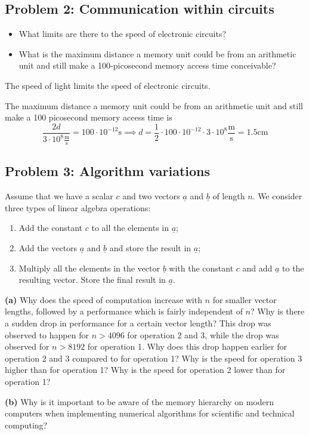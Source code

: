 \subsection{Problem 2: Communication within circuits} %
\label{sec:exercise_2}
\begin{question}
  \begin{itemize}
    \item What limits are there to the speed of electronic circuits?
    \item What is the maximum distance a memory unit could be from an arithmetic unit and still make a 100-picosecond memory access time conceivable?
  \end{itemize}
\end{question}

The speed of light limits the speed of electronic circuits.

The maximum distance a memory unit could be from an arithmetic unit and still make a 100 picosecond memory access time is
\begin{equation}
  \frac{2d}{3\cdot 10^8 \mathrm{\frac{m}{s}}} = 100\cdot 10^{-12} \mathrm{s}
  \implies d =\frac{1}{2} \cdot 100 \cdot 10^{-12} \cdot 3\cdot 10^8 \mathrm{\frac{m}{s}} = 1.5 \mathrm{cm}
\end{equation}
\pagebreak


\subsection{Problem 3: Algorithm variations} %
\label{sec:exercise_3_algorithm_variations}
\begin{question}
  Assume that we have a scalar $c$ and two vectors $\underline{a}$ and $\underline{b}$ of length $n$. We consider three types of linear algebra operations:
  \begin{enumerate}
    \item Add the constant $c$ to all the elements in $\underline{a}$;
    \item Add the vectors $\underline{a}$ and $\underline{b}$ and store the result in $\underline{a}$;
    \item Multiply all the elements in the vector $\underline{b}$ with the constant $c$ and add $\underline{a}$ to the resulting vector. Store the final result in $\underline{a}$.
  \end{enumerate}

  \textbf{(a)} Why does the speed of computation increase with $n$ for smaller vector lengths, followed by a performance which is fairly independent of $n$? Why is there a sudden drop in performance for a certain vector length? This drop was observed to happen for $n>4096$ for operation 2 and 3, while the drop was observed for $n>8192$ for operation 1. Why does this drop happen earlier for operation 2 and 3 compared to for operation 1? Why is the speed for operation 3 higher than for operation 1? Why is the speed for operation 2 lower than for operation 1?

  \textbf{(b)} Why is it important to be aware of the memory hierarchy on modern computers when implementing numerical algorithms for scientific and technical computing?
\end{question}

